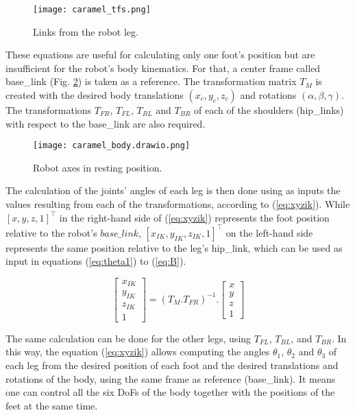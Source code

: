 \documentclass[conference]{IEEEtran}
\begin{document}
\begin{figure}[htbp]
  \centering
  \texttt{[image: caramel\_tfs.png]}
  
  \caption{Links from the robot leg.}
  \label{fig:caramel_tfs}
\end{figure}

These equations are useful for calculating only one foot's position but are insufficient for the robot's body kinematics. For that, a center frame called base\_link (Fig. \ref{fig:caramel_body}) is taken as a reference. The transformation matrix $T_M$ is created with the desired body translations $(x_c, y_c, z_c)$ and rotations $(\alpha, \beta, \gamma)$. The transformations $T_{FR}$, $T_{FL}$, $T_{BL}$ and $T_{BR}$ of each of the shoulders (hip\_links) with respect to the base\_link are also required.

\begin{figure}[htbp]
  \centering
  \vspace{-0.75cm}
  \texttt{[image: caramel\_body.drawio.png]}
  
  \caption{Robot axes in resting position.}
  \label{fig:caramel_body}
\end{figure}

The calculation of the joints' angles of each leg is then done using as inputs the values resulting from each of the transformations, according to (\ref{eq:xyzik}). While $[x, y, z, 1]^\top$ in the right-hand side of (\ref{eq:xyzik}) represents the foot position relative to the robot's $base\_link$, $[x_{IK}, y_{IK}, z_{IK}, 1]^\top$ on the left-hand side represents the same position relative to the leg's hip\_link, which can be used as input in equations (\ref{eq:theta1}) to (\ref{eq:B}). 

\begin{equation}
  \label{eq:xyzik}
  \begin{bmatrix}
    x_{IK} \\
    y_{IK} \\
    z_{IK} \\
    1
  \end{bmatrix}= (T_M.T_{FR})^{-1}.
  \begin{bmatrix}
    x \\
    y \\
    z \\
    1
  \end{bmatrix}
\end{equation}

The same calculation can be done for the other legs, using $T_{FL}$, $T_{BL}$, and $T_{BR}$. In this way, the equation (\ref{eq:xyzik}) allows computing the angles $\theta_1$, $\theta_2$ and $\theta_3$ of each leg from the desired position of each foot and the desired translations and rotations of the body, using the same frame as reference (base\_link). It means one can control all the six DoFs of the body together with the positions of the feet at the same time.
\end{document}

